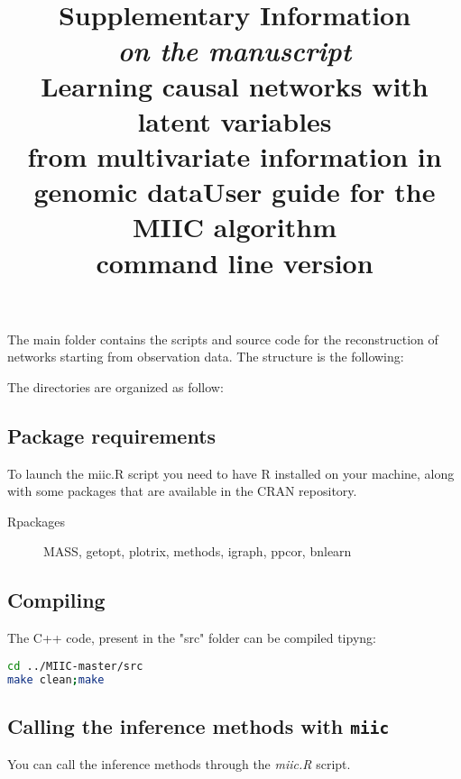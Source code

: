 \documentclass[12pt]{article}
\title{Supplementary Information\\
{\small \em on the manuscript}\\
Learning causal networks with latent variables\\ from multivariate information in genomic data} %
\title{User guide for the MIIC algorithm\\command line version}
\begin{document}
\maketitle
\date{}

The main folder contains the scripts and source code for the reconstruction of networks starting from observation data. The structure is the following:


The directories are organized as follow:



\subsection*{Package requirements}
To launch the miic.R script you need to have R installed on your machine, along with some packages that are available in the CRAN repository. 
\begin{description}
		\item[Rpackages]	MASS, getopt, plotrix, methods, igraph, ppcor, bnlearn   
\end{description}

\subsection*{Compiling}
The C++ code, present in the "src" folder can be compiled tipyng:
\begin{lstlisting}[language=bash]
cd ../MIIC-master/src
make clean;make
\end{lstlisting}


	
\subsection*{Calling the inference methods with {\tt miic}}

You can call the inference methods through the \textit{miic.R} script.
\end{document}

